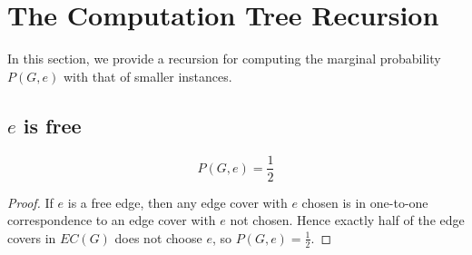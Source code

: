 \section{The Computation Tree Recursion}
In this section, we provide a recursion for computing the marginal probability $P(G, e)$ with that of smaller instances.

\subsection{$e$ is free}
\begin{Prop}
	\[P(G,e) = \frac{1}{2}\]
\end{Prop}
\begin{proof}
	If $e$ is a free edge, then any edge cover with $e$ chosen is in one-to-one correspondence to an edge cover with $e$ not chosen. Hence exactly half of the edge covers in $EC(G)$ does not choose $e$, so $P(G, e) = \frac{1}{2}$.
\end{proof}

